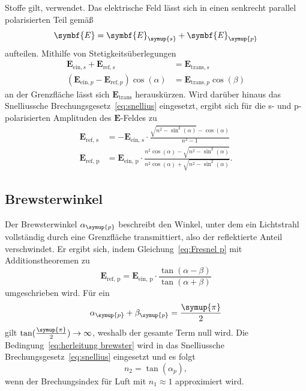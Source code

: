 Stoffe gilt, verwendet.
Das elektrische Feld lässt sich in einen senkrecht parallel polarisierten Teil gemäß
\begin{equation*}
    \symbf{E} = \symbf{E}_{\symup{s}} + \symbf{E}_{\symup{p}}
\end{equation*}
aufteilen. Mithilfe von Stetigkeitsüberlegungen 
\begin{align*}
    \symbf{E}_{\text{ein}, s} + \symbf{E}_{\text{ref}, s} &= \symbf{E}_{\text{trans}, s} \\
    (\symbf{E}_{\text{ein}, p} - \symbf{E}_{\text{ref}, p})\cos(\alpha) &= \symbf{E}_{\text{trans}, p} \cos(\beta)
\end{align*}
an der Grenzfläche lässt sich $\symbf{E}_{\text{trans}}$ herauskürzen. Wird darüber hinaus das Snelliussche
Brechungsgesetz~\eqref{eq:snellius} eingesetzt, ergibt sich für die s- und p-polarisierten Amplituden des 
$\symbf{E}$-Feldes zu
\begin{align}
    \symbf{E}_{\text{ref, s}} &= -\symbf{E}_{\text{ein, s}} \cdot \frac{\sqrt{n^2-\sin^2(\alpha)}-\cos(\alpha)}{n^2-1}
    \label{eq:Fresnel s} \\
    \symbf{E}_{\text{ref, p}} &= \symbf{E}_{\text{ein, p}} \cdot \frac{n^2 \cos(\alpha) - \sqrt{n^2-\sin^2(\alpha)}}{n^2 \cos(\alpha) + \sqrt{n^2-\sin^2(\alpha)}}.
    \label{eq:Fresnel p}
\end{align}

\subsection{Brewsterwinkel}
Der Brewsterwinkel $\alpha_{\symup{p}}$ beschreibt den Winkel, unter dem ein Lichtstrahl vollständig durch
eine Grenzfläche transmittiert, also der reflektierte Anteil verschwindet. Er ergibt sich, indem 
Gleichung~\eqref{eq:Fresnel p} mit Additionstheoremen zu
\begin{equation*}
    \symbf{E}_{\text{ref, p}} = \symbf{E}_{\text{ein, p}} \cdot \frac{\tan(\alpha-\beta)}{\tan(\alpha+\beta)}
\end{equation*}
umgeschrieben wird. Für ein 
\begin{equation}
    \alpha_{\symup{p}}+\beta_{\symup{p}}=\frac{\symup{\pi}}{2}
    \label{eq:herleitung brewster}
\end{equation}
gilt $\tan(\frac{\symup{\pi}}{2}) \to \infty$, 
weshalb der gesamte Term null wird. Die Bedingung~\eqref{eq:herleitung brewster} wird in das Snelliussche
Brechungsgesetz~\eqref{eq:snellius} eingesetzt und es folgt
\begin{equation}
    n_2 = \tan(\alpha_p),
    \label{eq:Brewsterwinkel}
\end{equation}
wenn der Brechungsindex für Luft mit $n_1\approx 1$ approximiert wird.